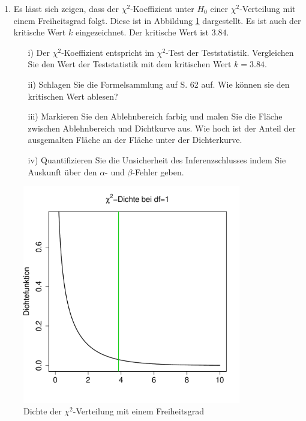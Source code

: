 \documentclass[11pt]{article}
\begin{document}
\begin{enumerate}
\begin{enumerate}
{ nach dem p-Wert. Kann die Forschungshypothese nachgewiesen werden?}
 \item{Es lässt sich zeigen, dass der $\chi^{2}$-Koeffizient unter $H_{0}$ einer $\chi^{2}$-Verteilung mit einem Freiheitsgrad folgt. Diese ist in Abbildung
 \ref{abb1} dargestellt. Es ist auch der kritische Wert $k$ eingezeichnet. Der kritische Wert ist $3.84.$
 \begin{itemize}
 \item[i)]{Der  $\chi^{2}$-Koeffizient entspricht im  $\chi^{2}$-Test der Teststatistik. Vergleichen Sie den Wert der Teststatistik mit dem kritischen Wert 
 $k=3.84.$ }
 \item[ii)]{Schlagen Sie die Formelsammlung auf S. 62 auf. Wie können sie den kritischen Wert ablesen?}
 \item[iii)]{Markieren Sie den Ablehnbereich farbig und malen Sie die Fläche zwischen  Ablehnbereich und Dichtkurve aus. Wie hoch ist der Anteil der
 ausgemalten Fläche an der Fläche unter der Dichterkurve. }
 \item[iv)]{Quantifizieren Sie die Unsicherheit des Inferenzschlusses indem Sie Auskunft über den $\alpha$- und $\beta$-Fehler geben.}
 \end{itemize}
 }
\end{enumerate}
 \begin{figure}[ht]
 	\centering
 	      \includegraphics[width=0.85\textwidth]{chi2.pdf}
 	      \caption{Dichte der $\chi^{2}$-Verteilung mit einem Freiheitsgrad
 	       \label{abb1}}
 	\end{figure}


\end{enumerate}
\end{document}
